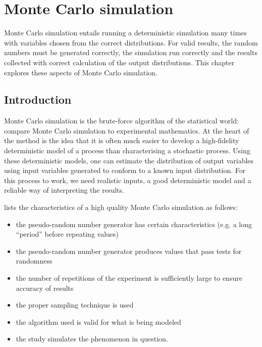 \chapter{Monte Carlo simulation}

\begin{overview}
  Monte Carlo simulation entails running a deterministic simulation many times with variables chosen from the correct distributions.
  For valid results, the random numbers must be generated correctly, the simulation run correctly and the results collected with correct calculation of the output distributions.
  This chapter explores these aspects of Monte Carlo simulation.
\end{overview}

\section{Introduction}
Monte Carlo simulation is the brute-force algorithm of the statistical world:
\citet{hammersley.handscomb1965monte} compare Monte Carlo simulation to experimental mathematics.
At the heart of the method is the idea that it is often much easier to develop a high-fidelity deterministic model of a process than characterising a stochastic process.
Using these deterministic models, one can estimate the distribution of output variables using input variables generated to conform to a known input distribution.
For this process to work, we need realistic inputs, a good deterministic model and a reliable way of interpreting the results.


\citet{sawilowsky2003you} lists the characteristics of a high quality Monte Carlo simulation as follows:

\begin{itemize}
\item the pseudo-random number generator has certain characteristics (e.g. a long “period” before repeating values)
\item the pseudo-random number generator produces values that pass tests for randomness
\item the number of repetitions of the experiment is sufficiently large to ensure accuracy of results
\item the proper sampling technique is used
\item the algorithm used is valid for what is being modeled
\item the study simulates the phenomenon in question.
\end{itemize}

